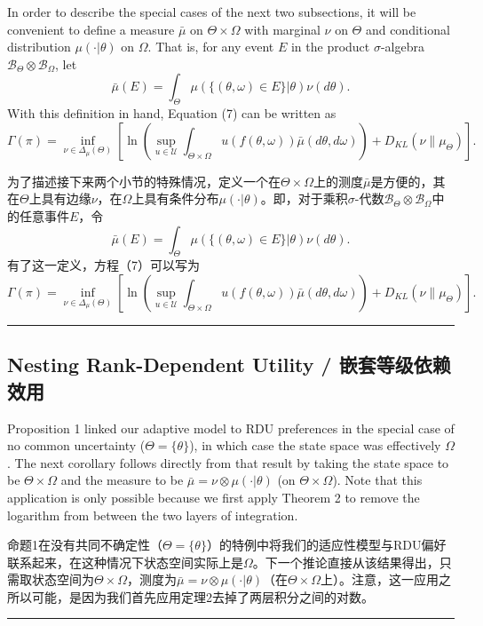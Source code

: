 \documentclass[12pt,a4paper]{article}
\newenvironment{original}
  {\par\noindent\color{black}\smallskip}
  {\par\smallskip}
\newenvironment{translation}
  {\par\noindent\color{blue!70!black}\smallskip}
  {\par\medskip\hrule\medskip}
\begin{document}
\begin{original}
In order to describe the special cases of the next two subsections, it will be convenient to define a measure $\bar{\mu}$ on $\Theta \times \Omega$ with marginal $\nu$ on $\Theta$ and conditional distribution $\mu(\cdot|\theta)$ on $\Omega$. That is, for any event $E$ in the product $\sigma$-algebra $\mathcal{B}_\Theta \otimes \mathcal{B}_\Omega$, let
\[
\bar{\mu}(E) = \int_\Theta \mu(\{(\theta, \omega) \in E\} | \theta) \nu(d\theta).
\]
With this definition in hand, Equation (7) can be written as
\[
\Gamma(\pi) = \inf_{\nu \in \Delta_\mu(\Theta)} \left[ \ln\left( \sup_{u \in \mathcal{U}} \int_{\Theta \times \Omega} u(f(\theta, \omega)) \bar{\mu}(d\theta, d\omega) \right) + D_{KL}(\nu\|\mu_\Theta) \right].
\]
\end{original}
\begin{translation}
为了描述接下来两个小节的特殊情况，定义一个在$\Theta \times \Omega$上的测度$\bar{\mu}$是方便的，其在$\Theta$上具有边缘$\nu$，在$\Omega$上具有条件分布$\mu(\cdot|\theta)$。即，对于乘积$\sigma$-代数$\mathcal{B}_\Theta \otimes \mathcal{B}_\Omega$中的任意事件$E$，令
\[
\bar{\mu}(E) = \int_\Theta \mu(\{(\theta, \omega) \in E\} | \theta) \nu(d\theta).
\]
有了这一定义，方程（7）可以写为
\[
\Gamma(\pi) = \inf_{\nu \in \Delta_\mu(\Theta)} \left[ \ln\left( \sup_{u \in \mathcal{U}} \int_{\Theta \times \Omega} u(f(\theta, \omega)) \bar{\mu}(d\theta, d\omega) \right) + D_{KL}(\nu\|\mu_\Theta) \right].
\]
\end{translation}

\subsection{Nesting Rank-Dependent Utility / 嵌套等级依赖效用}

\begin{original}
Proposition 1 linked our adaptive model to RDU preferences in the special case of no common uncertainty ($\Theta = \{\theta\}$), in which case the state space was effectively $\Omega$. The next corollary follows directly from that result by taking the state space to be $\Theta \times \Omega$ and the measure to be $\bar{\mu} = \nu \otimes \mu(\cdot|\theta)$ (on $\Theta \times \Omega$). Note that this application is only possible because we first apply Theorem 2 to remove the logarithm from between the two layers of integration.
\end{original}
\begin{translation}
命题1在没有共同不确定性（$\Theta = \{\theta\}$）的特例中将我们的适应性模型与RDU偏好联系起来，在这种情况下状态空间实际上是$\Omega$。下一个推论直接从该结果得出，只需取状态空间为$\Theta \times \Omega$，测度为$\bar{\mu} = \nu \otimes \mu(\cdot|\theta)$（在$\Theta \times \Omega$上）。注意，这一应用之所以可能，是因为我们首先应用定理2去掉了两层积分之间的对数。
\end{translation}
\end{document}
